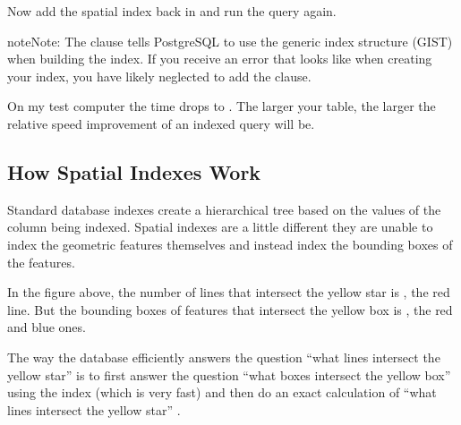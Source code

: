 \documentclass[a4paper,11pt,english]{sphinxmanual}
\begin{document}
Now add the spatial index back in and run the query again.

\begin{sphinxVerbatim}[commandchars=\\\{\}]
  
   
    
\end{sphinxVerbatim}

\begin{sphinxadmonition}{note}{Note:}
The  clause tells PostgreSQL to use the generic index structure (GIST) when building the index.  If you receive an error that looks like  when creating your index, you have likely neglected to add the  clause.
\end{sphinxadmonition}

On my test computer the time drops to . The larger your table, the larger the relative speed improvement of an indexed query will be.


\subsection{How Spatial Indexes Work}
\label{\detokenize{basic:how-spatial-indexes-work}}
Standard database indexes create a hierarchical tree based on the values of the column being indexed. Spatial indexes are a little different \textendash{} they are unable to index the geometric features themselves  and instead index the bounding boxes of the features.

\noindent{}

In the figure above, the number of lines that intersect the yellow star is , the red line. But the bounding boxes of features that intersect the yellow box is , the red and blue ones.

The way the database efficiently answers the question “what lines intersect the yellow star” is to first answer the question “what boxes intersect the yellow box” using the index (which is very fast) and then do an exact calculation of “what lines intersect the yellow star” .
\end{document}
